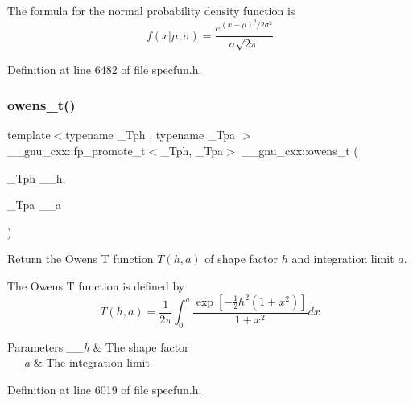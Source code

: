 The formula for the normal probability density function is \[ f(x|\mu,\sigma) = \frac{e^{(x-\mu)^2/2\sigma^2}}{\sigma\sqrt{2\pi}} \] 

Definition at line 6482 of file specfun.\+h.

\mbox{\label{group__gnu__math__spec__func_gab4e367aae19853cca3af99eead01fcaa}} 
\subsubsection{\texorpdfstring{owens\+\_\+t()}{owens\_t()}}
{\footnotesize\ttfamily template$<$typename \+\_\+\+Tph , typename \+\_\+\+Tpa $>$ \\
\+\_\+\+\_\+gnu\+\_\+cxx\+::fp\+\_\+promote\+\_\+t$<$\+\_\+\+Tph, \+\_\+\+Tpa$>$ \+\_\+\+\_\+gnu\+\_\+cxx\+::owens\+\_\+t (\begin{DoxyParamCaption}\item[{\+\_\+\+Tph}]{\+\_\+\+\_\+h,  }\item[{\+\_\+\+Tpa}]{\+\_\+\+\_\+a }\end{DoxyParamCaption})\hspace{0.3cm}{\ttfamily [inline]}}

Return the Owens T function $ T(h,a) $ of shape factor $ h $ and integration limit $ a $.

The Owens T function is defined by \[ T(h,a) = \frac{1}{2\pi}\int_0^a \frac{\exp\left[-\frac{1}{2}h^2(1+x^2)\right]}{1+x^2} dx \]


\begin{DoxyParams}{Parameters}
{\em \+\_\+\+\_\+h} & The shape factor \\
\hline
{\em \+\_\+\+\_\+a} & The integration limit \\
\hline
\end{DoxyParams}


Definition at line 6019 of file specfun.\+h.

\mbox{\label{group__gnu__math__spec__func_gac24d32e9b072c4953654d5559f992871}} 
